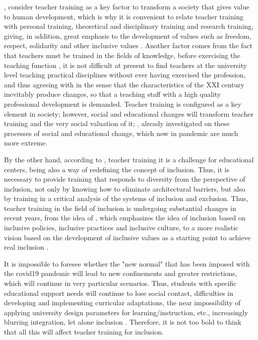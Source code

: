 \documentclass{textolivre}
\begin{document}
\textcite{nieva2016}, %
consider teacher training as a key factor to transform a society that gives value to human development, which is why it is convenient to relate teacher training with personal training, theoretical and disciplinary training and research training, giving, in addition, great emphasis to the development of values such as freedom, respect, solidarity and other inclusive values \cite{diazquero2006}. %
Another factor comes from the fact that teachers must be trained in the fields of knowledge, before exercising the teaching function \cite{aravena2020}, %
it is not difficult at present to find teachers at the university level teaching practical disciplines without ever having exercised the profession, and thus agreeing with \textcite{rodriguez2021} %
in the sense that the characteristics of the XXI century inevitably produce changes, so that a teaching staff with a high quality professional development is demanded. Teacher training is configured as a key element in society; however, social and educational changes will transform teacher training and the very social valuation of it; \textcite{vaillant2015}, %
already investigated on these processes of social and educational change, which now in pandemic are much more extreme.

By the other hand, according to \textcite{infante2011}, %
teacher training it is a challenge for educational centers, being also a way of redefining the concept of inclusion. Thus, it is necessary to provide training that responds to diversity from the perspective of inclusion, not only by knowing how to eliminate architectural barriers, but also by training in a critical analysis of the systems of inclusion and exclusion. Thus, teacher training in the field of inclusion is undergoing substantial changes in recent years, from the idea of \textcite{booth2000}, %
which emphasizes the idea of inclusion based on inclusive policies, inclusive practices and inclusive culture, to a more realistic vision based on the development of inclusive values as a starting point to achieve real inclusion \cite{arnaiz2019}. %

It is impossible to foresee whether the "new normal" that has been imposed with the covid19 pandemic will lead to new confinements and greater restrictions, which will continue in very particular scenarios. Thus, students with specific educational support needs will continue to lose social contact, difficulties in developing and implementing curricular adaptations, the near impossibility of applying university design parameters for learning/instruction, etc., increasingly blurring integration, let alone inclusion \cite{moreno2020}. %
Therefore, it is not too bold to think that all this will affect teacher training for inclusion.
\end{document}
